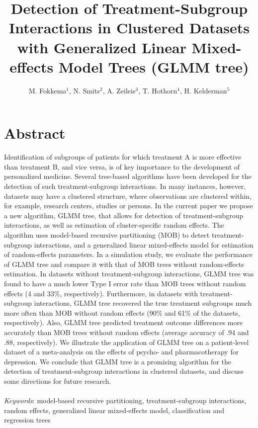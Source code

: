\documentclass[nobf,doc]{apa}
\title{Detection of Treatment-Subgroup Interactions in Clustered Datasets with Generalized Linear Mixed-effects Model Trees (GLMM tree)}
\author{M. Fokkema$^1$, N. Smits$^2$, A. Zeileis$^3$, T. Hothorn$^4$, H. Kelderman$^5$}
\affiliation{$^1$Universiteit Leiden, $^2$Universiteit van Amsterdam, $^3$Universit\"{a}t Innsbruck, $^4$Universit\"{a}t Z\"{u}rich, $^5$Universiteit Leiden and Vrije Universiteit, Amsterdam}
\begin{document}
\maketitle
\pagewiselinenumbers

\section{Abstract}
Identification of subgroups of patients for which treatment A is more effective than treatment B, and vice versa, is of key importance to the development of personalized medicine. Several tree-based algorithms have been developed for the detection of such treatment-subgroup interactions. In many instances, however, datasets may have a clustered structure, where observations are clustered within, for example, research centers, studies or persons. In the current paper we propose a new algorithm, GLMM tree, that allows for detection of treatment-subgroup interactions, as well as estimation of cluster-specific random effects. The algorithm uses model-based recursive partitioning (MOB) to detect treatment-subgroup interactions, and a generalized linear mixed-effects model for estimation of random-effects parameters. In a simulation study, we evaluate the performance of GLMM tree and compare it with that of MOB trees without random-effects estimation. In datasets without treatment-subgroup interactions, GLMM tree was found to have a much lower Type I error rate than MOB trees without random effects (4 and 33\%, respectively). Furthermore, in datasets with treatment-subgroup interactions, GLMM tree recovered the true treatment subgroups much more often than MOB without random effects (90\% and 61\% of the datasets, respectively). Also, GLMM tree predicted treatment outcome differences more accurately than MOB trees without random effects (average accuracy of .94 and .88, respectively). We illustrate the application of GLMM tree on a patient-level dataset of a meta-analysis on the effects of psycho- and pharmacotherapy for depression. We conclude that GLMM tree is a promising algorithm for the detection of treatment-subgroup interactions in clustered datasets, and discuss some directions for future research.\\
\\
\textit{Keywords}: model-based recursive partitioning, treatment-subgroup interactions, random effects, generalized linear mixed-effects model, classification and regression trees
\end{document}

